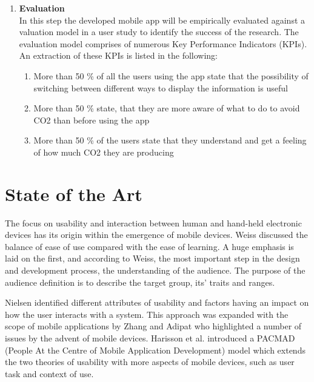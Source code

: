 \documentclass[12pt,a4paper,titlepage,oneside]{article}
\begin{document}
\begin{enumerate}
	\item \textbf{Evaluation} \\
	In this step the developed mobile app will be empirically evaluated against a valuation model in a user study to identify the success of the research. The evaluation model comprises of numerous Key Performance Indicators (KPIs). An extraction of these KPIs is listed in the following:
\begin{enumerate}
	\item More than 50 \% of all the users using the app state that the possibility of switching between different ways to display the information is useful
	\item More than 50 \% state, that they are more aware of what to do to avoid CO2 than before using the app
	\item More than 50 \% of the users state that they understand and get a feeling of how much CO2 they are producing
\end{enumerate}

	
\end{enumerate}

\section{State of the Art}
The focus on usability and interaction between human and hand-held electronic devices has its origin within the emergence of mobile devices. Weiss \cite{weiss2003handheld} discussed the balance of ease of use compared with the ease of learning. A huge emphasis is laid on the first, and according to Weiss, the most important step in the design and development process, the understanding of the audience. The purpose of the audience definition is to describe the target group, its' traits and ranges.

Nielsen \cite{nielsen1994usability} identified different attributes of usability and factors having an impact on how the user interacts with a system. This approach was expanded with the scope of mobile applications by Zhang and Adipat \cite{zhang2005challenges} who highlighted a number of issues by the advent of mobile devices. Harisson et al. \cite{harrison2013usability} introduced a PACMAD (People At the Centre of Mobile Application Development) model which extends the two theories of usability with more aspects of mobile devices, such as user task and context of use. 
\end{document}
